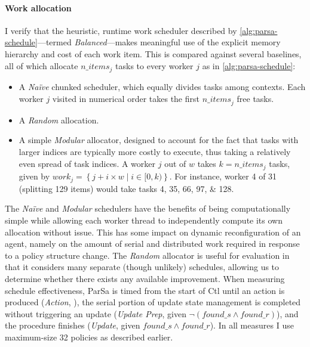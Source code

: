 \paragraph{Work allocation}
I verify that the heuristic, runtime work scheduler described by \cref{alg:parsa-schedule}---termed \emph{Balanced}---makes meaningful use of the explicit memory hierarchy and cost of each work item.
This is compared against several baselines, all of which allocate $\mathit{n\_items}_j$ tasks to every worker $j$ as in \cref{alg:parsa-schedule}:
\begin{itemize}
	\item A \emph{Na\"{i}ve} chunked scheduler, which equally divides tasks among contexts. Each worker $j$ visited in numerical order takes the first $\mathit{n\_items}_j$ free tasks.
	\item A \emph{Random} allocation.
	\item A simple \emph{Modular} allocator, designed to account for the fact that tasks with larger indices are typically more costly to execute, thus taking a relatively even spread of task indices. A worker $j$ out of $w$ takes $k=\mathit{n\_items}_j$ tasks, given by $\mathit{work}_j=\left\{j + i \times w \mid i \in [0,k) \right\}$. For instance, worker \num{4} of \num{31} (splitting \num{129} items) would take tasks \numlist{4;35;66;97;128}.
\end{itemize}
The \emph{Na\"{i}ve} and \emph{Modular} schedulers have the benefits of being computationally simple while allowing each worker thread to independently compute its own allocation without issue.
This has some impact on dynamic reconfiguration of an \approachshort{} agent, namely on the amount of serial and distributed work required in response to a policy structure change.
The \emph{Random} allocator is useful for evaluation in that it considers many separate (though unlikely) schedules, allowing us to determine whether there exists any available improvement.
When measuring schedule effectiveness, ParSa is timed from the start of Ctl until an action is produced (\emph{Action}, ), the serial portion of update state management is completed without triggering an update (\emph{Update Prep},  given $\lnot \left(\mathit{found\_s} \land{} \mathit{found\_r}\right)$), and the procedure finishes (\emph{Update},  given $\mathit{found\_s} \land{} \mathit{found\_r}$).
In all measures I use maximum-size \qty{32}{\bit} policies as described earlier.

